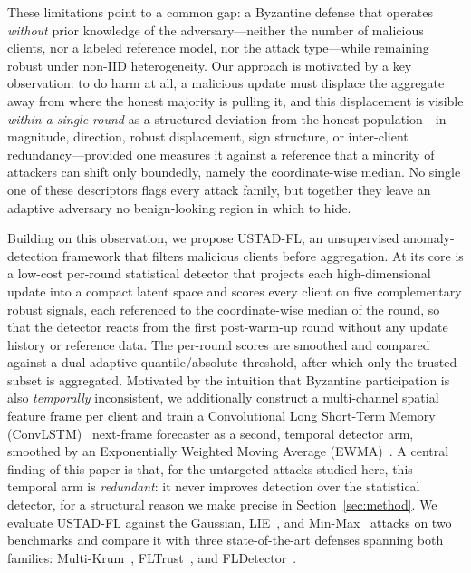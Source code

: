\documentclass[journal]{IEEEtran}
\begin{document}
These limitations point to a common gap: a Byzantine defense that operates \emph{without} prior knowledge of the adversary---neither the number of malicious clients, nor a labeled reference model, nor the attack type---while remaining robust under non-IID heterogeneity. Our approach is motivated by a key observation: to do harm at all, a malicious update must displace the aggregate away from where the honest majority is pulling it, and this displacement is visible \emph{within a single round} as a structured deviation from the honest population---in magnitude, direction, robust displacement, sign structure, or inter-client redundancy---provided one measures it against a reference that a minority of attackers can shift only boundedly, namely the coordinate-wise median. No single one of these descriptors flags every attack family, but together they leave an adaptive adversary no benign-looking region in which to hide.

Building on this observation, we propose USTAD-FL, an unsupervised anomaly-detection framework that filters malicious clients before aggregation. At its core is a low-cost per-round statistical detector that projects each high-dimensional update into a compact latent space and scores every client on five complementary robust signals, each referenced to the coordinate-wise median of the round, so that the detector reacts from the first post-warm-up round without any update history or reference data. The per-round scores are smoothed and compared against a dual adaptive-quantile/absolute threshold, after which only the trusted subset is aggregated. Motivated by the intuition that Byzantine participation is also \emph{temporally} inconsistent, we additionally construct a multi-channel spatial feature frame per client and train a Convolutional Long Short-Term Memory (ConvLSTM)~\cite{shi2015convolutional} next-frame forecaster as a second, temporal detector arm, smoothed by an Exponentially Weighted Moving Average (EWMA)~\cite{hunter1986exponentially}. A central finding of this paper is that, for the untargeted attacks studied here, this temporal arm is \emph{redundant}: it never improves detection over the statistical detector, for a structural reason we make precise in Section~\ref{sec:method}. We evaluate USTAD-FL against the Gaussian, LIE~\cite{baruch2019little}, and Min-Max~\cite{shejwalkar2021manipulating} attacks on two benchmarks and compare it with three state-of-the-art defenses spanning both families: Multi-Krum~\cite{blanchard2017machine}, FLTrust~\cite{cao2020fltrust}, and FLDetector~\cite{zhang2022fldetector}.
\end{document}
